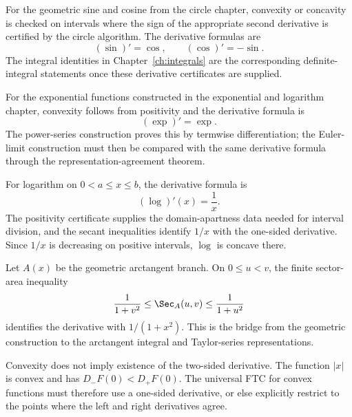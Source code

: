 \begin{example}\label{ex:trig-derivatives}
For the geometric sine and cosine from the circle chapter, convexity or
concavity is checked on intervals where the sign of the appropriate second
derivative is certified by the circle algorithm.  The derivative formulas are
\[
  (\sin)'=\cos,\qquad (\cos)'=-\sin.
\]
The integral identities in Chapter~\ref{ch:integrals} are the corresponding
definite-integral statements once these derivative certificates are supplied.
\end{example}

\begin{example}[Exponential]\label{ex:exp-derivative}
For the exponential functions constructed in the exponential and logarithm
chapter, convexity follows from positivity and the derivative formula is
\[
  (\exp)'=\exp.
\]
The power-series construction proves this by termwise differentiation; the
Euler-limit construction must then be compared with the same derivative
formula through the representation-agreement theorem.
\end{example}

\begin{example}[Logarithm]\label{ex:log-ftc}
For logarithm on \(0<a\le x\le b\), the derivative formula is
\[
  (\log)'(x)=\frac1x.
\]
The positivity certificate supplies the domain-apartness data needed for
interval division, and the secant inequalities identify \(1/x\) with the
one-sided derivative.  Since \(1/x\) is decreasing on positive intervals,
\(\log\) is concave there.
\end{example}

\begin{example}\label{ex:arctan-ftc}
Let \(A(x)\) be the geometric arctangent branch.  On \(0\le u<v\), the finite
sector-area inequality
\[
  \frac{1}{1+v^2}
  \le
  \Sec_A(u,v)
  \le
  \frac{1}{1+u^2}
\]
identifies the derivative with \(1/(1+x^2)\).  This is the bridge from the
geometric construction to the arctangent integral and Taylor-series
representations.
\end{example}

\begin{remark}[Corners]\label{rem:convex-corners}
Convexity does not imply existence of the two-sided derivative.  The function
\(|x|\) is convex and has \(D_-F(0)<D_+F(0)\).  The universal FTC for convex
functions must therefore use a one-sided derivative, or else explicitly
restrict to the points where the left and right derivatives agree.
\end{remark}


